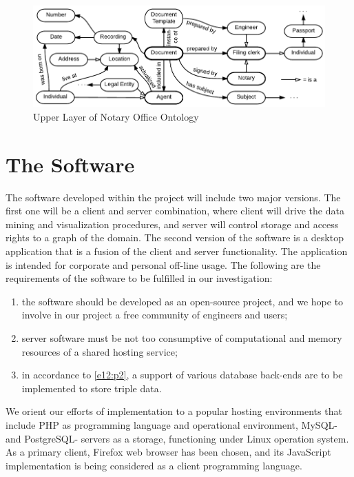\documentclass[conference]{IEEEtran}
\begin{document}
\begin{figure}[!t]
\centering
\includegraphics[width=\linewidth]{DocumentOntology-en.pdf}
\caption{Upper Layer of Notary Office Ontology}
\label{notaryontology}
\end{figure}

\section{The Software}
\label{sec:arch}

The software developed within the project will include two major
versions.  The first one will be a client and server combination,
where client will drive the data mining and visualization procedures,
and server will control storage and access rights to a graph of the
domain.  The second version of the software is a desktop application
that is a fusion of the client and server functionality.  The
application is intended for corporate and personal off-line usage.
The following are the requirements of the software to be fulfilled in
our investigation:
\begin{enumerate}
\item the software should be developed as an open-source project, and
  we hope to involve in our project a free community of engineers and
  users;
\item server software must be not too consumptive of computational and
  memory resources of a shared hosting service; \label{e12:p2}
\item in accordance to \ref{e12:p2}, a support of various database
  back-ends are to be implemented to store triple data.
\end{enumerate}

We orient our efforts of implementation to a popular hosting
environments that include PHP as programming language and operational
environment, MySQL- and PostgreSQL- servers as a storage, functioning
under Linux operation system.  As a primary client, Firefox web
browser has been chosen, and its JavaScript implementation is being
considered as a client programming language.
\end{document}
